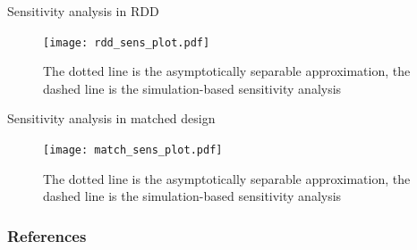 \documentclass[table, xcolor={dvipsnames}, 9pt]{beamer}
\theoremstyle{newstyle}
\begin{document}
\begin{frame}{Sensitivity analysis in RDD}
\begin{figure}
\texttt{[image: rdd\_sens\_plot.pdf]}
\caption{The dotted line is the asymptotically separable approximation, the dashed line is the simulation-based sensitivity analysis}
\end{figure}
\end{frame}
\begin{frame}{Sensitivity analysis in matched design}

\begin{figure}
\texttt{[image: match\_sens\_plot.pdf]}
\caption{The dotted line is the asymptotically separable approximation, the dashed line is the simulation-based sensitivity analysis}
\end{figure}

\end{frame}

\begin{frame}[allowframebreaks]
\frametitle{References} 
\scriptsize

\end{frame}
\end{document}
